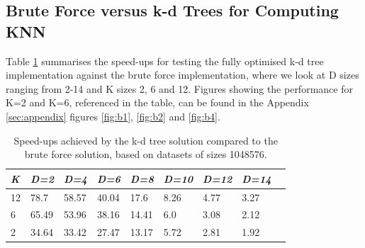 \subsection{Brute Force versus k-d Trees for Computing KNN}











Table \ref{tab:total} summarises the speed-ups for testing the fully optimised k-d tree implementation against the brute force implementation, where we look at D sizes ranging from 2-14 and K sizes 2, 6 and 12. Figures showing the performance for K=2 and K=6, referenced in the table, can be found in the Appendix \ref{sec:appendix} figures \ref{fig:b1}, \ref{fig:b2} and \ref{fig:b4}.
\begin{table}[H]
\centering
\begin{tabular}{@{} *9l @{}}    \toprule
\emph{K} & \emph{D=2} & \emph{D=4} & \emph{D=6} & \emph{D=8} & \emph{D=10} & \emph{D=12} & \emph{D=14} & \\\midrule
12 & 78.7 & 58.57 & 40.04 & 17.6 & 8.26 & 4.77 & 3.27   &   \\ 
6 & 65.49 & 53.96 & 38.16 & 14.41 & 6.0 & 3.08& 2.12    & \\ 
2 &  34.64 & 33.42 & 27.47 & 13.17 & 5.72 & 2.81 & 1.92	& \\ \bottomrule
 \hline
\end{tabular}
\caption{Speed-ups achieved by the k-d tree solution compared to the brute force solution, based on datasets of sizes 1048576.}
\label{tab:total}
\end{table}

